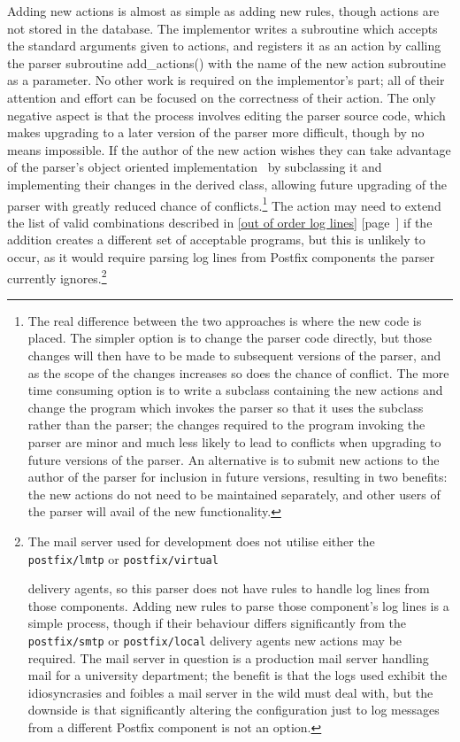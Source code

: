 \documentclass[a4paper,12pt,draft]{article}
\newcommand{\refwithpage}[1]{%
    \empty{}\ref{#1} [page~\pageref{#1}]%
}
\newcommand{\sectionref}[1]{%
    \textsection{}\refwithpage{#1}%
}
\newcommand{\daemon}[1]{%
    \texttt{postfix/#1}%
}
\begin{document}
Adding new actions is almost as simple as adding new rules, though actions
are not stored in the database.  The implementor writes a subroutine which
accepts the standard arguments given to actions, and registers it as an
action by calling the parser subroutine add\_actions() with the name of the
new action subroutine as a parameter.  No other work is required on the
implementor's part; all of their attention and effort can be focused on the
correctness of their action.  The only negative aspect is that the process
involves editing the parser source code, which makes upgrading to a later
version of the parser more difficult, though by no means impossible.  If
the author of the new action wishes they can take advantage of the parser's
object oriented implementation~\cite{Wikipedia-object-orientation} by
subclassing it and implementing their changes in the derived class,
allowing future upgrading of the parser with greatly reduced chance of
conflicts.\footnote{The real difference between the two approaches is where
the new code is placed.  The simpler option is to change the parser code
directly, but those changes will then have to be made to subsequent
versions of the parser, and as the scope of the changes increases so does
the chance of conflict.  The more time consuming option is to write a
subclass containing the new actions and change the program which invokes
the parser so that it uses the subclass rather than the parser; the changes
required to the program invoking the parser are minor and much less likely
to lead to conflicts when upgrading to future versions of the parser.  An
alternative is to submit new actions to the author of the parser for
inclusion in future versions, resulting in two benefits: the new actions do
not need to be maintained separately, and other users of the parser will
avail of the new functionality.} The action may need to extend the list of
valid combinations described in \sectionref{out of order log lines} if the
addition creates a different set of acceptable programs, but this is
unlikely to occur, as it would require parsing log lines from Postfix
components the parser currently ignores.\footnote{The mail server used for
development does not utilise either the \daemon{lmtp} or \daemon{virtual}
delivery agents, so this parser does not have rules to handle log lines
from those components.  Adding new rules to parse those component's log
lines is a simple process, though if their behaviour differs significantly
from the \daemon{smtp} or \daemon{local} delivery agents new actions may be
required.  The mail server in question is a production mail server handling
mail for a university department; the benefit is that the logs used exhibit
the idiosyncrasies and foibles a mail server in the wild must deal with,
but the downside is that significantly altering the configuration just to
log messages from a different Postfix component is not an option.}
\end{document}
